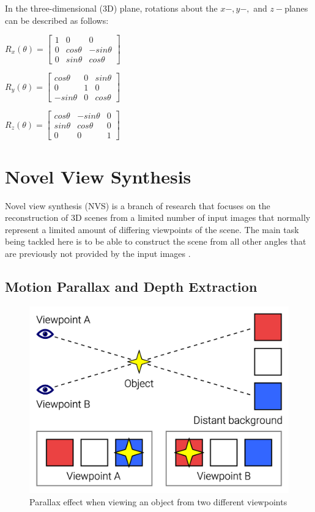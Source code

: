 In the three-dimensional (3D) plane, rotations about the \(x-, y-,\) and \(z-\)planes can be described as follows:

\begin{center}
    \(R_x(\theta) = 
    \begin{bmatrix}
        1 & 0 & 0 \\
        0 & cos\theta & -sin\theta \\
        0 & sin\theta & cos\theta
    \end{bmatrix}
    \)

    \(R_y(\theta) =
    \begin{bmatrix}
        cos\theta & 0 & sin\theta \\
        0 & 1 & 0 \\
        -sin\theta & 0 & cos\theta
    \end{bmatrix}
    \)

    \(R_z(\theta) =
    \begin{bmatrix}
        cos\theta & -sin\theta & 0 \\
        sin\theta & cos\theta & 0 \\
        0 & 0 & 1
    \end{bmatrix}
    \)
\end{center}

\section{Novel View Synthesis}

Novel view synthesis (NVS) is a branch of research that focuses on the reconstruction of 3D scenes from a limited number of input images that normally represent a limited amount of differing viewpoints of the scene. The main task being tackled here is to be able to construct the scene from all other angles that are previously not provided by the input images \parencite{SynSin}. 

\subsection{Motion Parallax and Depth Extraction}

\begin{figure}[h]
    \centering
    \includegraphics[width=0.5\linewidth]{figures/parallax_example_01.png}
    \caption{Parallax effect when viewing an object from two different viewpoints}
    \label{fig:parallax_01}
\end{figure}

